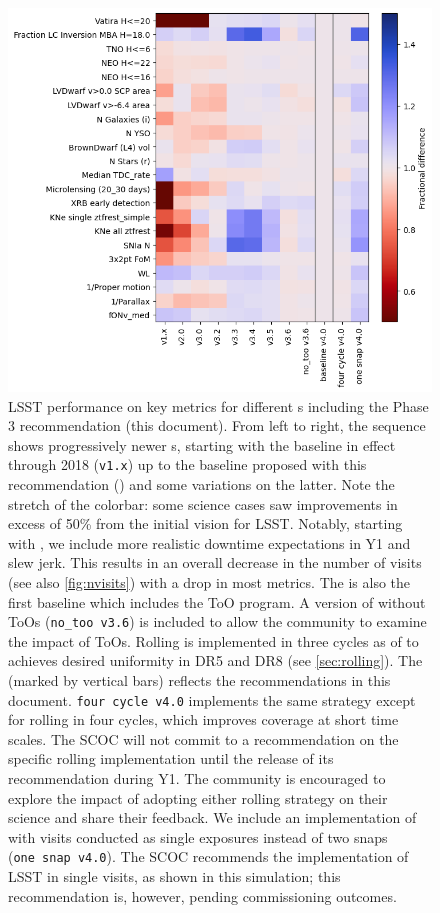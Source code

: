 \begin{figure}
    \centering
    \includegraphics[width=0.9\linewidth]{figures/scoc_heatmap.png}
    \caption{LSST performance on key metrics for different \opsim s including the Phase 3 recommendation (this document). From left to right, the sequence shows progressively newer \opsim s, starting with the baseline in effect through 2018 (\texttt{v1.x}) up to the baseline proposed with this recommendation () and some variations on the latter. Note the stretch of the colorbar: some science cases saw improvements in excess of 50\% from the initial vision for LSST. Notably, starting with , we include more realistic downtime expectations in Y1 and slew jerk. This results in an overall decrease in the number of visits (see also \autoref{fig:nvisits}) with a drop in most metrics. The  is also the first baseline which includes the ToO program. A version of  without ToOs (\texttt{no\_too v3.6}) is included to allow the community to examine the impact of ToOs. Rolling is implemented in three cycles as of  to achieves desired uniformity in DR5 and DR8 (see \autoref{sec:rolling}). The  (marked by vertical bars) reflects the recommendations in this document. \texttt{four cycle v4.0} implements the same strategy except for rolling in four cycles, which improves coverage at short time scales.  The SCOC will not commit to a recommendation on the specific rolling implementation until the release of its recommendation during Y1. The community is encouraged to explore the impact of adopting either rolling strategy on their science and share their feedback.  We include an implementation of  with visits conducted as single exposures instead of two snaps (\texttt{one~snap~v4.0}). The SCOC recommends the implementation of LSST in single visits, as shown in this simulation; this recommendation is, however, pending commissioning outcomes.}
    \label{fig:summary}
\end{figure}



\FloatBarrier
